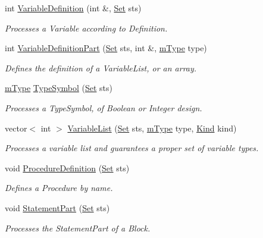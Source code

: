 \begin{DoxyCompactItemize}
int \hyperlink{classParser_a20052e491dc7c5f812dc2784f760731a}{VariableDefinition} (int \&, \hyperlink{classSet}{Set} sts)
\begin{DoxyCompactList}\small\item\em Processes a Variable according to Definition. \item\end{DoxyCompactList}\item 
int \hyperlink{classParser_a897a786bb66431b5f1cc0d3c76da5250}{VariableDefinitionPart} (\hyperlink{classSet}{Set} sts, int \&, \hyperlink{blocktable_8h_a636cfca014f3212ea82d45e28f9cb51b}{mType} type)
\begin{DoxyCompactList}\small\item\em Defines the definition of a VariableList, or an array. \item\end{DoxyCompactList}\item 
\hyperlink{blocktable_8h_a636cfca014f3212ea82d45e28f9cb51b}{mType} \hyperlink{classParser_acc92d496e62aa2a482092dea20de2e67}{TypeSymbol} (\hyperlink{classSet}{Set} sts)
\begin{DoxyCompactList}\small\item\em Processes a TypeSymbol, of Boolean or Integer design. \item\end{DoxyCompactList}\item 
vector$<$ int $>$ \hyperlink{classParser_a6ef905d0e7690e53c6794afdffa953cf}{VariableList} (\hyperlink{classSet}{Set} sts, \hyperlink{blocktable_8h_a636cfca014f3212ea82d45e28f9cb51b}{mType} type, \hyperlink{blocktable_8h_aa10c9e8951b8ccf714a59ec321bdac5b}{Kind} kind)
\begin{DoxyCompactList}\small\item\em Processes a variable list and guarantees a proper set of variable types. \item\end{DoxyCompactList}\item 
void \hyperlink{classParser_ae1399c8e85c6b366db055dd12914b0da}{ProcedureDefinition} (\hyperlink{classSet}{Set} sts)
\begin{DoxyCompactList}\small\item\em Defines a Procedure by name. \item\end{DoxyCompactList}\item 
void \hyperlink{classParser_ac3ae7245f6ecc00a9e14cbed66a0b347}{StatementPart} (\hyperlink{classSet}{Set} sts)
\begin{DoxyCompactList}\small\item\em Processes the StatementPart of a Block. \item\end{DoxyCompactList}\item 

\end{DoxyCompactItemize}
